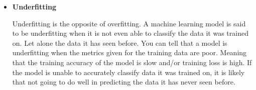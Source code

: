 \begin{itemize}
  \item  \textbf{Underfitting}
  \par
  Underfitting is the opposite of overfitting. A machine learning model is said to be underfitting when it is not even able to classify the data it was trained on. Let alone the data it has seen before. You can tell that a model is underfitting when the metrics given for the training data are poor. Meaning that the training accuracy of the model is slow and/or training loss is high. If the model is unable to accurately classify data it was trained on, it is likely that not going to do well in predicting the data it has never seen before.
\end{itemize}
